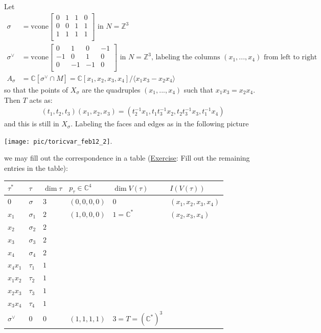 \documentclass[a4paper,12pt]{amsart}
\newcommand{\ZZ}{\mathbb{Z}}
\newcommand{\CC}{\mathbb{C}}
\begin{document}
\begin{Eg}
Let
\begin{align*}
\sigma &= \text{vcone} \begin{bmatrix}
0 & 1 & 1 & 0 \\
0 & 0 & 1 & 1 \\
1 & 1 & 1 & 1 \\
\end{bmatrix} \text{ in } N = \ZZ^3 \\
\sigma^\vee &= \text{vcone} \begin{bmatrix}
0 & 1 & 0 & -1 \\
-1 & 0 & 1 & 0 \\
0 & -1 & -1 & 0 \\
\end{bmatrix} \text{ in } N = \ZZ^3 \text{, labeling the columns } (x_1, ..., x_4) \text{ from left to right } \\
A_\sigma &= \CC[\sigma^\vee \cap M] = \CC[x_1, x_2, x_3, x_4] / \langle x_1 x_3 - x_2 x_4 \rangle
\end{align*}
so that the points of $X_\sigma$ are the quadruples $(x_1, ..., x_4)$ such that $x_1 x_3 = x_2 x_4$. Then $T$ acts as:
\begin{align*}
	(t_1, t_2, t_3) (x_1, x_2, x_3) = (t_2^{-1} x_1, t_1 t_3^{-1} x_2, t_2 t_3^{-1} x_3, t_1^{-1} x_4)
\end{align*}
and this is still in $X_\sigma$. Labeling the faces and edges as in the following picture 
\begin{center}
\texttt{[image: pic/toricvar\_feb12\_2]}.
\end{center}
we may fill out the correspondence in a table (\underline{Exercise}: Fill out the remaining entries in the table):

\begin{center}
\begin{tabular}{|l|l|l|l|l|l|}
\hline
\textbf{$\tau ^*$} & \textbf{$\tau$} & \textbf{$\dim \tau$} & \textbf{$p_\tau \in \CC^4$} & \textbf{$\dim V(\tau)$} & \textbf{$I(V(\tau))$} \\ \hline
$0$ & $\sigma$  & $3$ &  $(0,0,0,0)$ & $0$ & $(x_1, x_2, x_3, x_4)$ \\ \hline
$x_1$ & $\sigma_1$  & $2$ & $(1,0,0,0)$   & $1 = \CC^*$  & $(x_2, x_3, x_4)$  \\ \hline
$x_2$ & $\sigma_2$ &  $2$ & &  &  \\ \hline
$x_3$ & $\sigma_3$ &  $2$ & &  &  \\ \hline
$x_4$ & $\sigma_4$ &  $2$ & &  &  \\ \hline
$x_4 x_1$ & $\tau_1$  & $1$ &  &  &  \\ \hline
$x_1 x_2$ & $\tau_2$ & $1$ &  &  &  \\ \hline
$x_2 x_3$ & $\tau_3$ & $1$ &  &  &  \\ \hline
$x_3 x_4$ & $\tau_4$ & $1$  &  &  &  \\ \hline
$\sigma^\vee$ & $0$  & $0$ & $(1,1,1,1)$  & $3 = T = (\CC^*)^3$  &  \\ \hline
\end{tabular}
\end{center}
\end{Eg}
\end{document}
